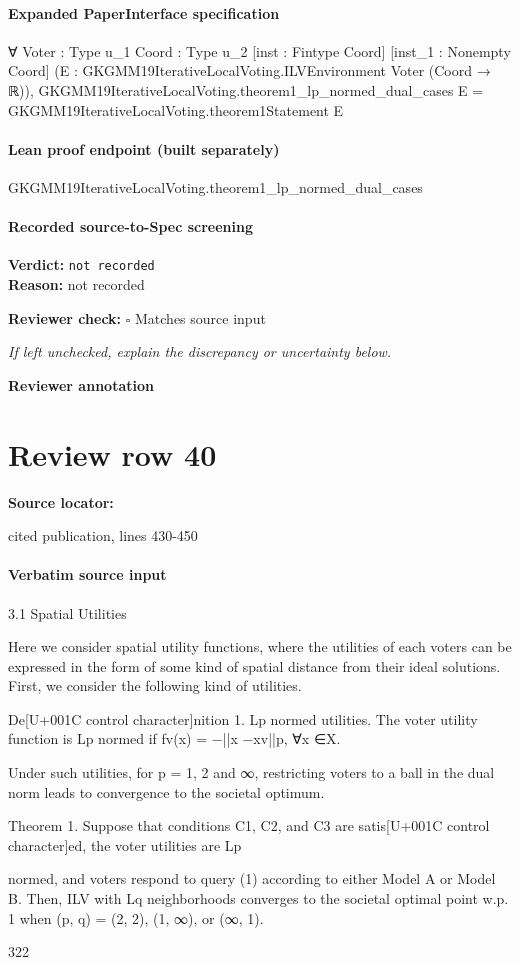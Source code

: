 \documentclass[10pt]{article}
\newcommand{\reviewerbox}{%
  \par\noindent\fbox{\parbox{0.96\linewidth}{\rule{0pt}{0.38in}}}\par
}
\newcommand{\reviewmatch}[1]{%
  \par\noindent\textbf{Reviewer check:} $\square$\; #1\par
  \noindent\emph{If left unchecked, explain the discrepancy or uncertainty below.}\par
}
\begin{document}
\paragraph{Expanded PaperInterface specification}
\begin{ReviewVerbatim}
∀ {Voter : Type u_1} {Coord : Type u_2} [inst : Fintype Coord] [inst_1 : Nonempty Coord]
  (E : GKGMM19IterativeLocalVoting.ILVEnvironment Voter (Coord → ℝ)),
  GKGMM19IterativeLocalVoting.theorem1_lp_normed_dual_cases E = GKGMM19IterativeLocalVoting.theorem1Statement E
\end{ReviewVerbatim}

\paragraph{Lean proof endpoint (built separately)}\begin{ReviewVerbatim}
GKGMM19IterativeLocalVoting.theorem1_lp_normed_dual_cases
\end{ReviewVerbatim}

\paragraph{Recorded source-to-Spec screening}
\textbf{Verdict:} \texttt{not recorded}
\\
\textbf{Reason:} not recorded
\reviewmatch{Matches source input}
\noindent\textbf{Reviewer annotation}\par
\reviewerbox
\clearpage
\hypertarget{source-claim-ef1266fd9eeea090}{}
\section*{Review row 40}
\textbf{Source locator:} {\footnotesize\raggedright cited publication, lines 430-\allowbreak{}450\par}
\paragraph{Verbatim source input}
\begin{ReviewVerbatim}
3.1 Spatial Utilities

Here we consider spatial utility functions, where the utilities of each voters can be expressed
in the form of some kind of spatial distance from their ideal solutions. First, we consider
the following kind of utilities.

De[U+001C control character]nition 1. Lp normed utilities. The voter utility function is Lp normed if fv(x) =
−||x −xv||p, ∀x ∈X.

Under such utilities, for p = 1, 2 and ∞, restricting voters to a ball in the dual norm
leads to convergence to the societal optimum.

Theorem 1. Suppose that conditions C1, C2, and C3 are satis[U+001C control character]ed, the voter utilities are Lp

normed, and voters respond to query (1) according to either Model A or Model B. Then,
ILV with Lq neighborhoods converges to the societal optimal point w.p. 1 when (p, q) = (2, 2),
(1, ∞), or (∞, 1).

322
\end{ReviewVerbatim}
\end{document}

